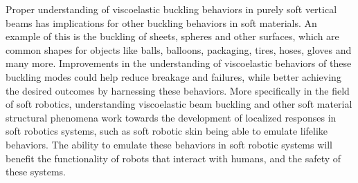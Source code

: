 Proper understanding of viscoelastic buckling behaviors in purely soft vertical beams has implications for other buckling behaviors in soft materials. An example of this is the buckling of sheets, spheres and other surfaces, which are common shapes for objects like balls, balloons, packaging, tires, hoses, gloves and many more. Improvements in the understanding of viscoelastic behaviors of these buckling modes could help reduce breakage and failures, while better achieving the desired outcomes by harnessing these behaviors. More specifically in the field of soft robotics, understanding viscoelastic beam buckling and other soft material structural phenomena work towards the development of localized responses in soft robotics systems, such as soft robotic skin being able to emulate lifelike behaviors. The ability to emulate these behaviors in soft robotic systems will benefit the functionality of robots that interact with humans, and the safety of these systems. \\
